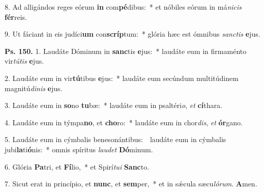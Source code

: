 8. Ad alligándos reges eórum \textbf{in} com\textbf{pé}dibus:~* et nóbiles eórum in má\textit{ni}\textit{cis} \textbf{fér}reis.

9. Ut fáciant in eis judíci\textbf{um} con\textbf{scríp}tum:~* glória hæc est ómnibus \textit{sanc}\textit{tis} \textbf{e}jus.

\textbf{Ps. 150.} 1. Laudáte Dóminum in \textbf{sanc}tis \textbf{e}jus:~* laudáte eum in firmaménto vir\textit{tú}\textit{tis} \textbf{e}jus.

2. Laudáte eum in vir\textbf{tú}tibus \textbf{e}jus:~* laudáte eum secúndum multitúdinem magnitú\textit{di}\textit{nis} \textbf{e}jus.

3. Laudáte eum in \textbf{so}no \textbf{tu}bæ:~* laudáte eum in psaltéri\textit{o}, \textit{et} \textbf{cí}thara.

4. Laudáte eum in týmpa\textbf{no}, et \textbf{cho}ro:~* laudáte eum in chor\textit{dis}, \textit{et} \textbf{ór}gano.

5. Laudáte eum in cýmbalis benesonántibus:~\GreDagger\ laudáte eum in cýmbalis jubi\textbf{la}ti\textbf{ó}nis:~* omnis spíritus \textit{lau}\textit{det} \textbf{Dó}minum.

6. Glória \textbf{Pa}tri, et \textbf{Fí}lio,~* et Spirí\textit{tu}\textit{i} \textbf{Sanc}to.

7. Sicut erat in princípio, et \textbf{nunc}, et \textbf{sem}per,~* et in s\'{\ae}cula sæcu\textit{ló}\textit{rum}. \textbf{A}men.